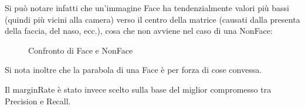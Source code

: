 \documentclass[
  italian,
]{article}
\begin{document}
\pagebreak

Si può notare infatti che un'immagine Face ha tendenzialmente valori più bassi
(quindi più vicini alla camera) verso il centro della matrice (causati
dalla presenta della faccia, del naso, ecc.), cosa che non avviene nel caso di una NonFace:

\begin{figure}
\centering
{}%
\qquad
{}%
\caption{Confronto di Face e NonFace}
\end{figure}

Si nota inoltre che la parabola di una Face è per forza di cose convessa.
\newline

Il marginRate è stato invece scelto sulla base del miglior compromesso tra Precision e Recall.
\end{document}
